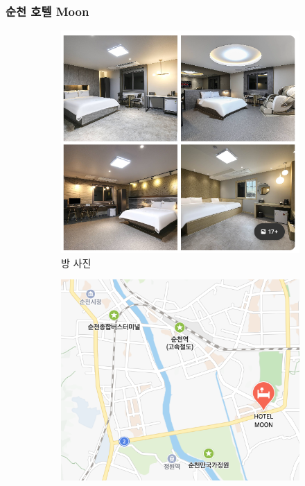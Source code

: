 \documentclass[10pt]{article}
\begin{document}
\subsubsection{순천 호텔 Moon}
\begin{figure}[htbp]
  \centering
  \begin{subfigure}{0.3\textwidth}
    \centering
    \includegraphics[width=\linewidth]{fig/5_방.png}
    \caption{방 사진}
    \label{fig:1}
  \end{subfigure}
  \hfill
  \begin{subfigure}{0.3\textwidth}
    \centering
    \includegraphics[width=\linewidth]{fig/5_위치.png}

\end{subfigure}
\end{figure}
\end{document}
